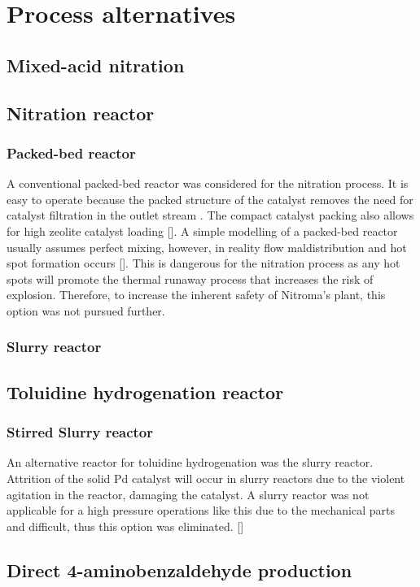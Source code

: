 \section{Process alternatives}
\label{app:alternatives}

\subsection{Mixed-acid nitration}
\label{mixed}

\subsection{Nitration reactor}
\label{nitrationreactor}
\subsubsection{Packed-bed reactor}
A conventional packed-bed reactor was considered for the nitration process. It is easy to operate because the packed structure of the catalyst removes the need for catalyst filtration in the outlet stream . The compact catalyst packing also allows for high zeolite catalyst loading []. A simple modelling of a packed-bed reactor usually assumes perfect mixing, however, in reality flow maldistribution and hot spot formation occurs []. This is dangerous for the nitration process as any hot spots will promote the thermal runaway process that increases the risk of explosion. Therefore, to increase the inherent safety of Nitroma's plant, this option was not pursued further.

\subsubsection{Slurry reactor}

\subsection{Toluidine hydrogenation reactor}
\label{toluidine}
\subsubsection{Stirred Slurry reactor}
An alternative reactor for toluidine hydrogenation was the slurry reactor. Attrition of the solid Pd catalyst will occur in slurry reactors due to the violent agitation in the reactor, damaging the catalyst. A slurry reactor was not applicable for a high pressure operations like this due to the mechanical parts and difficult, thus this option was eliminated. []


\subsection{Direct 4-aminobenzaldehyde production}
\label{direct}